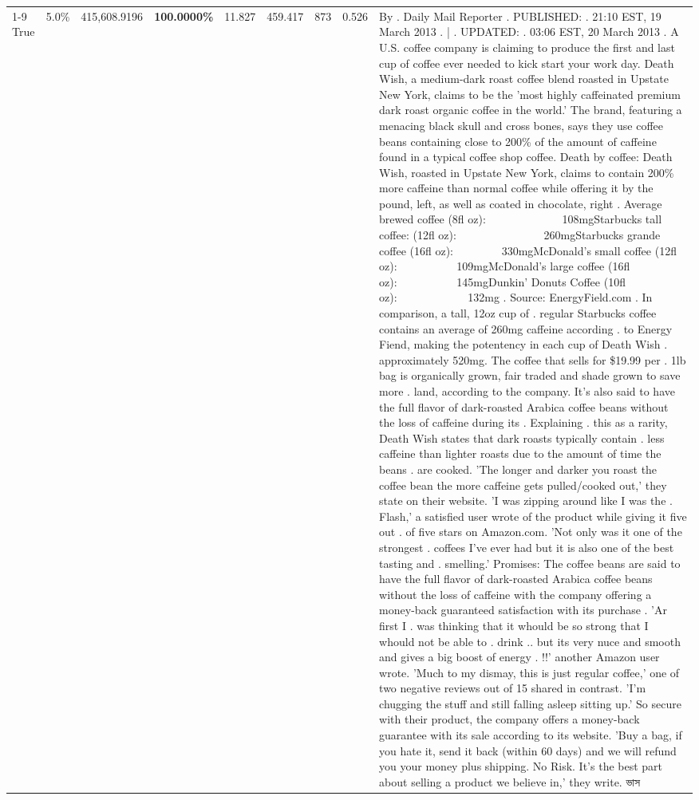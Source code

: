 \begin{table}[H]
{\begin{tabular}{lllrlllll}
\cline{1-9}
True & 5.0\% & 415,608.9196 & \bfseries \color{red} 100.0000\% & 11.827 & 459.417 & 873 & 0.526 & By . Daily Mail Reporter . PUBLISHED: . 21:10 EST, 19 March 2013 . | . UPDATED: . 03:06 EST, 20 March 2013 . A U.S. coffee company is claiming to produce the first and last cup of coffee ever needed to kick start your work day. Death Wish, a medium-dark roast coffee blend roasted in Upstate New York, claims to be the 'most highly caffeinated premium dark roast organic coffee in the world.' The brand, featuring a menacing black skull and cross bones, says they use coffee beans containing close to 200\% of the amount of caffeine found in a typical coffee shop coffee. Death by coffee: Death Wish, roasted in Upstate New York, claims to contain 200\% more caffeine than normal coffee while offering it by the pound, left, as well as coated in chocolate, right . Average brewed coffee (8fl oz):              108mgStarbucks tall coffee: (12fl oz):                260mgStarbucks grande coffee (16fl oz):         330mgMcDonald's small coffee (12fl oz):           109mgMcDonald's large coffee (16fl oz):           145mgDunkin' Donuts Coffee (10fl oz):             132mg . Source: EnergyField.com . In comparison, a tall, 12oz cup of . regular Starbucks coffee contains an average of 260mg caffeine according . to Energy Fiend, making the potentency in each cup of Death Wish . approximately 520mg. The coffee that sells for \$19.99 per . 1lb bag is organically grown, fair traded and shade grown to save more . land, according to the company. It's also said to have the full flavor of dark-roasted Arabica coffee beans without the loss of caffeine during its . Explaining . this as a rarity, Death Wish states that dark roasts typically contain . less caffeine than lighter roasts due to the amount of time the beans . are cooked. 'The longer and darker you roast the coffee bean the more caffeine gets pulled/cooked out,' they state on their website. 'I was zipping around like I was the . Flash,' a satisfied user wrote of the product while giving it five out . of five stars on Amazon.com. 'Not only was it one of the strongest . coffees I've ever had but it is also one of the best tasting and . smelling.’ Promises: The coffee beans are said to have the full flavor of dark-roasted Arabica coffee beans without the loss of caffeine with the company offering a money-back guaranteed satisfaction with its purchase . 'Ar first I . was thinking that it whould be so strong that I whould not be able to . drink .. but its very nuce and smooth and gives a big boost of energy . !!' another Amazon user wrote. 'Much to my dismay, this is just regular coffee,' one of two negative reviews out of 15 shared in contrast. 'I'm chugging the stuff and still falling asleep sitting up.' So secure with their product, the company offers a money-back guarantee with its sale according to its website. 'Buy a bag, if you hate it, send it back (within 60 days) and we will refund you your money plus shipping. No Risk. It’s the best part about selling a product we believe in,' they write. ভাস \\

\end{tabular}}
\end{table}
